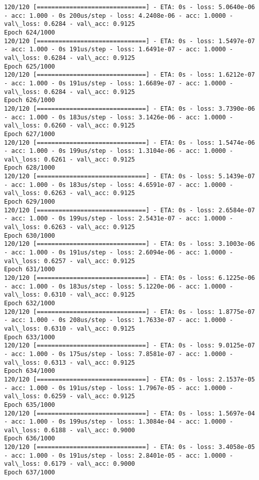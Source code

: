 \documentclass[11pt]{article}
\begin{document}
\begin{Verbatim}[commandchars=\\\{\}]
120/120 [==============================] - ETA: 0s - loss: 5.0640e-06 - acc: 1.000 - 0s 200us/step - loss: 4.2408e-06 - acc: 1.0000 - val\_loss: 0.6284 - val\_acc: 0.9125
Epoch 624/1000
120/120 [==============================] - ETA: 0s - loss: 1.5497e-07 - acc: 1.000 - 0s 191us/step - loss: 1.6491e-07 - acc: 1.0000 - val\_loss: 0.6284 - val\_acc: 0.9125
Epoch 625/1000
120/120 [==============================] - ETA: 0s - loss: 1.6212e-07 - acc: 1.000 - 0s 191us/step - loss: 1.6689e-07 - acc: 1.0000 - val\_loss: 0.6284 - val\_acc: 0.9125
Epoch 626/1000
120/120 [==============================] - ETA: 0s - loss: 3.7390e-06 - acc: 1.000 - 0s 183us/step - loss: 3.1426e-06 - acc: 1.0000 - val\_loss: 0.6260 - val\_acc: 0.9125
Epoch 627/1000
120/120 [==============================] - ETA: 0s - loss: 1.5474e-06 - acc: 1.000 - 0s 199us/step - loss: 1.3104e-06 - acc: 1.0000 - val\_loss: 0.6261 - val\_acc: 0.9125
Epoch 628/1000
120/120 [==============================] - ETA: 0s - loss: 5.1439e-07 - acc: 1.000 - 0s 183us/step - loss: 4.6591e-07 - acc: 1.0000 - val\_loss: 0.6263 - val\_acc: 0.9125
Epoch 629/1000
120/120 [==============================] - ETA: 0s - loss: 2.6584e-07 - acc: 1.000 - 0s 199us/step - loss: 2.5431e-07 - acc: 1.0000 - val\_loss: 0.6263 - val\_acc: 0.9125
Epoch 630/1000
120/120 [==============================] - ETA: 0s - loss: 3.1003e-06 - acc: 1.000 - 0s 191us/step - loss: 2.6094e-06 - acc: 1.0000 - val\_loss: 0.6257 - val\_acc: 0.9125
Epoch 631/1000
120/120 [==============================] - ETA: 0s - loss: 6.1225e-06 - acc: 1.000 - 0s 183us/step - loss: 5.1220e-06 - acc: 1.0000 - val\_loss: 0.6310 - val\_acc: 0.9125
Epoch 632/1000
120/120 [==============================] - ETA: 0s - loss: 1.8775e-07 - acc: 1.000 - 0s 208us/step - loss: 1.7633e-07 - acc: 1.0000 - val\_loss: 0.6310 - val\_acc: 0.9125
Epoch 633/1000
120/120 [==============================] - ETA: 0s - loss: 9.0125e-07 - acc: 1.000 - 0s 175us/step - loss: 7.8581e-07 - acc: 1.0000 - val\_loss: 0.6313 - val\_acc: 0.9125
Epoch 634/1000
120/120 [==============================] - ETA: 0s - loss: 2.1537e-05 - acc: 1.000 - 0s 191us/step - loss: 1.7967e-05 - acc: 1.0000 - val\_loss: 0.6259 - val\_acc: 0.9125
Epoch 635/1000
120/120 [==============================] - ETA: 0s - loss: 1.5697e-04 - acc: 1.000 - 0s 199us/step - loss: 1.3084e-04 - acc: 1.0000 - val\_loss: 0.6188 - val\_acc: 0.9000
Epoch 636/1000
120/120 [==============================] - ETA: 0s - loss: 3.4058e-05 - acc: 1.000 - 0s 191us/step - loss: 2.8401e-05 - acc: 1.0000 - val\_loss: 0.6179 - val\_acc: 0.9000
Epoch 637/1000

\end{Verbatim}
\end{document}
